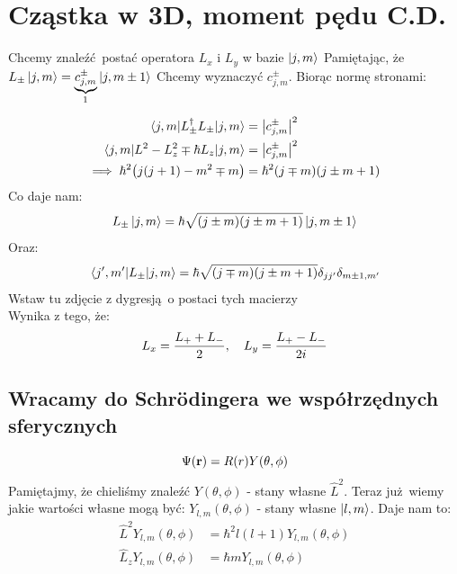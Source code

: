 \documentclass[12pt,a4paper]{report}
\newcommand{\com}[1]{{\color{red} #1}}
\newenvironment{lecture}[1]{\par\medskip
   \noindent\chapter{#1} \rmfamily}{\medskip}
\begin{document}
\begin{lecture}{Cząstka w 3D, moment pędu C.D.}
Chcemy znaleźć postać operatora $L_x$ i $L_y$ w bazie $\ket{j,m}$
Pamiętając, że $L_{\pm} \ket{j,m} = \underbrace{c_{j,m}^{\pm}}_{\footnotemark} \ket{j , m\pm1}$
Chcemy wyznaczyć $c_{j,m}^{\pm}$. Biorąc normę stronami:
\begin{align*}
    \ev{L_{\pm}^\dagger L_{\pm}}{j,m} &= \abs{c_{j,m}^{\pm}}^2\\
    \ev{L^2 - L_z^2 \mp \hbar L_z}{j,m} &= \abs{c_{j,m}^{\pm}}^2\\
    \implies \hbar^2\qty(j(j+1) - m^2 \mp m) &= \hbar^2 \qty(j \mp m) \qty(j \pm m + 1)
\end{align*}
Co daje nam:
\[
    L_{\pm}\ket{j,m} = \hbar \sqrt{\qty(j \pm m)\qty(j \pm m + 1)} \ket{j, m\pm1}
\]
Oraz:
\[
    \mel{j',m'}{L_{\pm}}{j,m} = \hbar \sqrt{\qty(j\mp m)\qty(j \pm m +1)} \delta_{jj'}\delta_{m\pm1,m'}
\]
\com{Wstaw tu zdjęcie z dygresją o postaci tych macierzy}\\
Wynika z tego, że:
\[
    L_x = \frac{L_{+} + L_{-}}{2}\qc L_y = \frac{L_{+} - L_{-}}{2i}
\]

\section{Wracamy do Schrödingera we współrzędnych sferycznych}
\[
    \Psi(\vb{r}) = R(r)Y(\theta, \phi)
\]
Pamiętajmy, że chieliśmy znaleźć $Y(\theta, \phi)$ - stany własne $\hat{L}^2$. Teraz już wiemy jakie wartości własne mogą być: $Y_{l,m}(\theta, \phi)$ - stany własne $\ket{l,m}$. Daje nam to:
\begin{align}
    \hat{L}^2 Y_{l,m}(\theta, \phi) &= \hbar^2 l (l+1) Y_{l,m}(\theta, \phi) \label{eq:lec_15:gwiazdka_1}\\
    \hat{L}_z Y_{l,m}(\theta, \phi) &= \hbar m Y_{l,m}(\theta, \phi) \label{eq:lec_15:gwiazdka_2}
\end{align}


\end{lecture}
\end{document}

